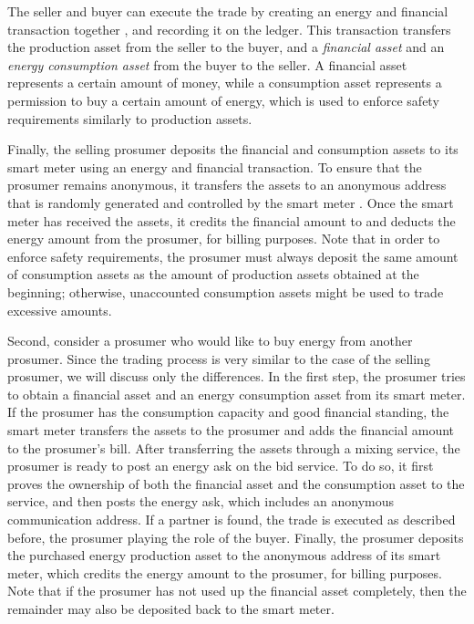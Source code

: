 The seller and buyer can execute the trade by creating an energy and financial transaction together , and recording it on the ledger.
This transaction transfers the production asset from the seller to the buyer, and a \emph{financial asset} and an \emph{energy consumption asset} from the buyer to the seller.
A financial asset represents a certain amount of money, while a consumption asset represents a permission to buy a certain amount of energy, which is used to enforce safety requirements similarly to production assets.

Finally, the selling prosumer deposits the financial and consumption assets to its smart meter using an energy and financial transaction.
To ensure that the prosumer remains anonymous, it transfers the assets to an anonymous address that is randomly generated and controlled by the smart meter .
Once the smart meter has received the assets, it credits the financial amount to and deducts the energy amount from the prosumer, for billing purposes.
Note that in order to enforce safety requirements, the prosumer must always deposit the same amount of consumption assets as the amount of production assets obtained at the beginning; otherwise, unaccounted consumption assets might be used to trade excessive amounts.

Second, consider a prosumer who would like to buy energy from another prosumer.
Since the trading process is very similar to the case of the selling prosumer, we will discuss only the differences.
In the first step, the prosumer tries to obtain a financial asset and an energy consumption asset from its smart meter.
If the prosumer has the consumption capacity and good financial standing, the smart meter transfers the assets to the prosumer and adds the financial amount to the prosumer's bill.
After transferring the assets through a mixing service, the prosumer is ready to post an energy ask on the bid service.
To do so, it first proves the ownership of both the financial asset and the consumption asset to the service, and then posts the energy ask, which includes an anonymous communication address.
If a partner is found, the trade is executed as described before, the prosumer playing the role of the buyer.
Finally, the prosumer deposits the purchased energy production asset to the anonymous address of its smart meter,
which credits the energy amount to the prosumer, for billing purposes.
Note that if the prosumer has not used up the financial asset completely, then the remainder may also be deposited back to the smart meter.





